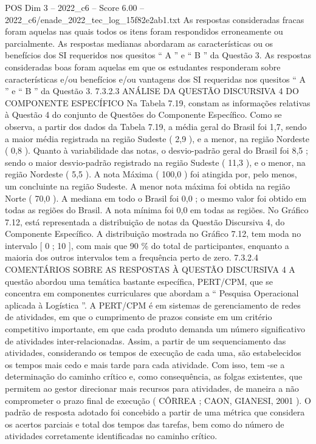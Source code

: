 \begin{textsample}{POS Dim 3 – 2022\_c6 – Score 6.00 – 2022\_c6/enade\_2022\_tec\_log\_15f82e2ab1.txt}
As respostas consideradas fracas foram aquelas nas quais todos os itens foram respondidos erroneamente ou parcialmente.
As respostas medianas abordaram as características ou os benefícios dos SI requeridos nos quesitos “ A ” e “ B ” da Questão 3.
As respostas consideradas boas foram aquelas em que os estudantes responderam sobre características e/ou benefícios e/ou vantagens dos SI requeridas nos quesitos “ A ” e “ B ” da Questão 3. 7.3.2.3 ANÁLISE DA QUESTÃO DISCURSIVA 4 DO COMPONENTE ESPECÍFICO Na Tabela 7.19, constam as informações relativas à Questão 4 do conjunto de Questões do Componente Específico.
Como se observa, a partir dos dados da Tabela 7.19, a média geral do Brasil foi 1,7, sendo a maior média registrada na região Sudeste ( 2,9 ), e a menor, na região Nordeste ( 0,8 ).
Quanto à variabilidade das notas, o desvio-padrão geral do Brasil foi 8,5 ; sendo o maior desvio-padrão registrado na região Sudeste ( 11,3 ), e o menor, na região Nordeste ( 5,5 ).
A nota Máxima ( 100,0 ) foi atingida por, pelo menos, um concluinte na região Sudeste.
A menor nota máxima foi obtida na região Norte ( 70,0 ).
A mediana em todo o Brasil foi 0,0 ; o mesmo valor foi obtido em todas as regiões do Brasil.
A nota mínima foi 0,0 em todas as regiões.
No Gráfico 7.12, está representada a distribuição de notas da Questão Discursiva 4, do Componente Específico.
A distribuição mostrada no Gráfico 7.12, tem moda no intervalo [ 0 ; 10 ], com mais que 90 \% do total de participantes, enquanto a maioria dos outros intervalos tem a frequência perto de zero. 7.3.2.4 COMENTÁRIOS SOBRE AS RESPOSTAS À QUESTÃO DISCURSIVA 4 A questão abordou uma temática bastante específica, PERT/CPM, que se concentra em componentes curriculares que abordam a “ Pesquisa Operacional aplicada à Logística ”.
A PERT/CPM é em sistemas de gerenciamento de redes de atividades, em que o cumprimento de prazos consiste em um critério competitivo importante, em que cada produto demanda um número significativo de atividades inter-relacionadas.
Assim, a partir de um sequenciamento das atividades, considerando os tempos de execução de cada uma, são estabelecidos os tempos mais cedo e mais tarde para cada atividade.
Com isso, tem -se a determinação do caminho crítico e, como consequência, as folgas existentes, que permitem ao gestor direcionar mais recursos para atividades, de maneira a não comprometer o prazo final de execução ( CÔRREA ; CAON, GIANESI, 2001 ).
O padrão de resposta adotado foi concebido a partir de uma métrica que considera os acertos parciais e total dos tempos das tarefas, bem como do número de atividades corretamente identificadas no caminho crítico.

\end{textsample}
